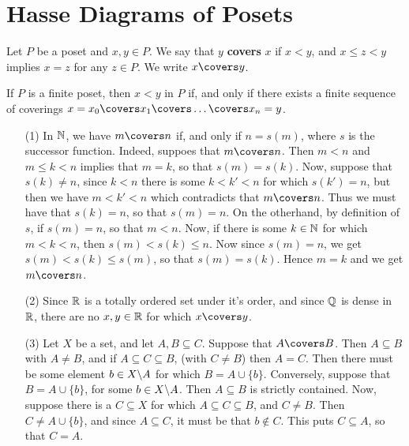 \section{Hasse Diagrams of Posets}

\begin{definition}
  Let $P$ be a poset and  $x,y \in P$. We say that $y$
  \textbf{covers} $x$ if  $x < y$, and  $x \leq z < y$ implies $x=z$
  for any  $z \in P$. We write $x \covers y$.
\end{definition}

\begin{lemma}\label{lemma_1.3.1}
  If $P$ is a finite poset, then  $x < y$ in $P$ if, and only if there
  exists a finite sequence of coverings $x=x_0 \covers x_1 \covers
  \dots \covers x_n=y$.
\end{lemma}

\begin{example}\label{example_1.6}
  \begin{enumerate}
    \item[(1)] In $\mathbb{N}$, we have  $m \covers n$ if, and only if
      $n=s(m)$, where $s$ is the successor function. Indeed, suppoes
      that  $m \covers n$. Then $m < n$ and  $m \leq k<n$ implies that
      $m=k$, so that $s(m)=s(k)$. Now, suppose that $s(k) \neq n$,
      since $k < n$ there is some $k<k'<n$ for which $s(k')=n$, but
      then we have $m<k'<n$ which contradicts that $m \covers n$. Thus
      we must have that $s(k)=n$, so that $s(m)=n$. On the otherhand,
      by definition of $s$, if  $s(m)=n$, so that $m<n$. Now, if there
     is some $k \in \mathbb{N}$ for which $m<k<n$, then $s(m)<s(k) \leq n$. Now
     since $s(m)=n$, we get $s(m)<s(k) \leq s(m)$, so that
     $s(m)=s(k)$. Hence $m=k$ and we get  $m \covers n$.

   \item[(2)] Since $\mathbb{R}$ is a totally ordered set under it's order,
     and since  $\mathbb{Q}$ is dense in  $\mathbb{R}$, there are no  $x,y \in \mathbb{R}$ for
     which $x \covers y$.

   \item[(3)] Let $X$ be a set, and let  $A,B \subseteq C$. Suppose
     that $A \covers B$. Then $A \subseteq B$ with $A \neq B$, and if
     $A \subseteq C \subseteq B$, (with $C \neq B$) then $A=C$. Then
     there must be some element  $b \in X \backslash A$ for which $B=A
     \cup \{b\}$. Conversely, suppose that $B=A \cup \{b\}$, for some
     $b \in X \backslash A$. Then $A \subseteq B$ is strictly contained.
     Now, suppose there is a $C \subseteq X$ for which $A \subseteq C
     \subseteq B$, and $C \neq B$. Then $C \neq A \cup \{b\}$, and
     since $A \subseteq C$, it must be that $b \notin C$. This puts
     $C \subseteq A$, so that $C=A$.
  \end{enumerate}
\end{example}

